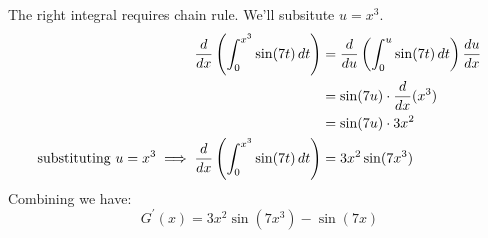 \documentclass[nooutcomes,handout]{ximera}
\begin{document}
\begin{problem}
\begin{enumerate}
\begin{freeResponse}
        The right integral requires chain rule.  We'll subsitute $u=x^3$.
        \begin{align*}
       \ddx \left( \int_0^{x^3} \sin(7t) \d t \right) &= \dd{u} \left( \int_0^{u} \sin(7t) \d t \right) \dd[u]{x}\\
                                 &=\sin(7u) \cdot \ddx(x^3)\\
                                 &=\sin(7u) \cdot 3x^2\\
 	\text{substituting}\ u=x^3  \implies \ddx \left( \int_0^{x^3} \sin(7t) \d t \right) &=3x^2 \sin(7x^3)
           \end{align*}
           Combining we have: 
                  $$G^\prime (x) = 3x^2 \sin(7x^3) - \sin(7x)$$
  
    \end{freeResponse}
  \end{enumerate}
\end{problem}
\end{document}
